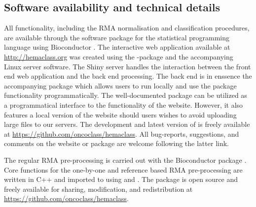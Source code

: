 \documentclass{article}
\begin{document}
\subsection{Software availability and technical details}
All \hemaClass{} functionality, including the RMA normalisation and classification procedures, are available through the software package  for the statistical programming language \R{} \citep{RCoreTeam} using Bioconductor \citep{Gentleman2004}.
The interactive web application available at \url{http://hemaclass.org} was created using the \R{}-package  \citep{shiny} and the accompanying Linux server software.
The Shiny server handles the interaction between the front end web application and the back end \R{} processing.
The back end is in enssence the accompanying  package which allows users to run \hemaClass{} locally and use the package functionality programmatically.
The well-documented package can be utilized as a programmatical interface to the functionality of the website.
However, it also features a local version of the website should users wishes to avoid uploading large files to our servers.
The development and latest version of  is freely available at \url{https://github.com/oncoclass/hemaclass}.
All bug-reports, suggestions, and comments on the website or package are welcome following the latter link.

The regular RMA pre-processing is carried out with the Bioconductor package  \citep{Gautier2004}.
Core functions for the one-by-one and reference based RMA pre-processing are written in \textsf{C++} and imported to \R{} using  and  \citep{Rcpp2013,Eddelbuettel2011,RcppArmadillo,Sanderson2010}.
The  package is open source and freely available for sharing, modification, and redistribution at \url{https://github.com/oncoclass/hemaclass}.
\end{document}

